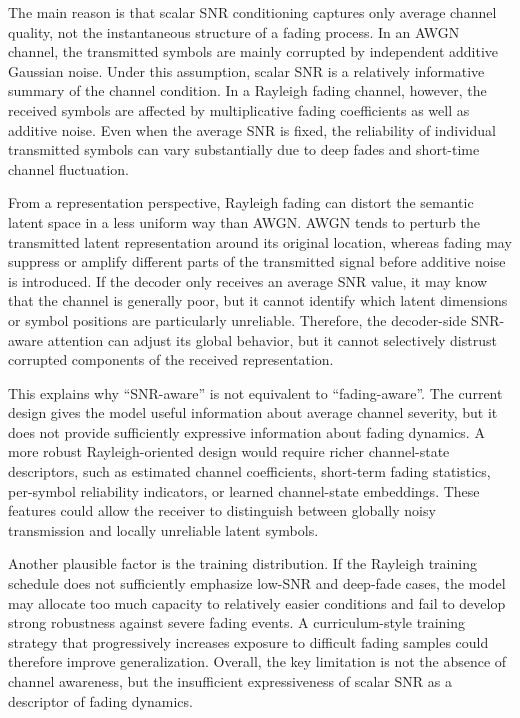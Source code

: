 The main reason is that scalar SNR conditioning captures only average channel quality, not the instantaneous structure of a fading process. In an AWGN channel, the transmitted symbols are mainly corrupted by independent additive Gaussian noise. Under this assumption, scalar SNR is a relatively informative summary of the channel condition. In a Rayleigh fading channel, however, the received symbols are affected by multiplicative fading coefficients as well as additive noise. Even when the average SNR is fixed, the reliability of individual transmitted symbols can vary substantially due to deep fades and short-time channel fluctuation.

From a representation perspective, Rayleigh fading can distort the semantic latent space in a less uniform way than AWGN. AWGN tends to perturb the transmitted latent representation around its original location, whereas fading may suppress or amplify different parts of the transmitted signal before additive noise is introduced. If the decoder only receives an average SNR value, it may know that the channel is generally poor, but it cannot identify which latent dimensions or symbol positions are particularly unreliable. Therefore, the decoder-side SNR-aware attention can adjust its global behavior, but it cannot selectively distrust corrupted components of the received representation.

This explains why “SNR-aware” is not equivalent to “fading-aware”. The current design gives the model useful information about average channel severity, but it does not provide sufficiently expressive information about fading dynamics. A more robust Rayleigh-oriented design would require richer channel-state descriptors, such as estimated channel coefficients, short-term fading statistics, per-symbol reliability indicators, or learned channel-state embeddings. These features could allow the receiver to distinguish between globally noisy transmission and locally unreliable latent symbols.

Another plausible factor is the training distribution. If the Rayleigh training schedule does not sufficiently emphasize low-SNR and deep-fade cases, the model may allocate too much capacity to relatively easier conditions and fail to develop strong robustness against severe fading events. A curriculum-style training strategy that progressively increases exposure to difficult fading samples could therefore improve generalization. Overall, the key limitation is not the absence of channel awareness, but the insufficient expressiveness of scalar SNR as a descriptor of fading dynamics.

